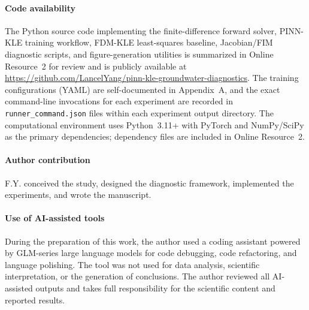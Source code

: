 \documentclass[pdflatex,sn-mathphys,Numbered,iicol]{sn-jnl}
\begin{document}
\paragraph{Code availability} The Python source code implementing the
finite-difference forward solver, PINN-KLE training workflow, FDM-KLE
least-squares baseline, Jacobian/FIM diagnostic scripts, and figure-generation
utilities is summarized in Online Resource~2 for review and is publicly
available at
\url{https://github.com/LancelYang/pinn-kle-groundwater-diagnostics}.
The training configurations (YAML) are self-documented in
Appendix~A, and the exact command-line invocations for each experiment are
recorded in {\tt runner\_command.json} files within each experiment output
directory. The computational environment uses Python~3.11+ with PyTorch and
NumPy/SciPy as the primary dependencies; dependency files are included in
Online Resource~2.

\paragraph{Author contribution} F.Y. conceived the study, designed the diagnostic framework, implemented the experiments, and wrote the manuscript.

\paragraph{Use of AI-assisted tools} During the preparation of this work, the
author used a coding assistant powered by GLM-series large language models
for code debugging, code refactoring, and language polishing.
The tool was not used for data analysis, scientific interpretation,
or the generation of conclusions. The author reviewed all AI-assisted outputs
and takes full responsibility for the scientific content and reported results.


\end{document}
